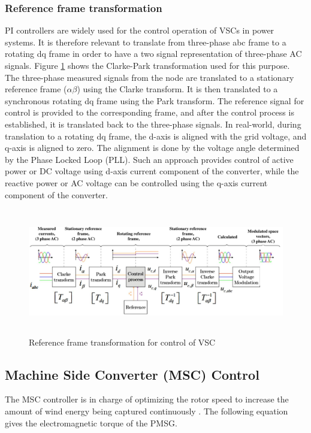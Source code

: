 \subsubsection{Reference frame transformation}\label{ref_frame_trafo}
\gls{PI} controllers are widely used for the control operation of \gls{VSC}s in power systems. It is therefore relevant to translate from three-phase abc frame to a rotating \gls{dq} frame in order to have a two signal representation of three-phase \gls{AC} signals. Figure \ref{fig:DQTransformation} shows the Clarke-Park transformation used for this purpose. The three-phase measured signals from the node are translated to a stationary reference frame ($\alpha \beta$) using the Clarke transform. It is then translated to a synchronous rotating \gls{dq} frame using the Park transform. The reference signal for control is provided to the corresponding frame, and after the control process is established, it is translated back to the three-phase signals. In real-world, during translation to a rotating \gls{dq} frame, the d-axis is aligned with the grid voltage, and q-axis is aligned to zero. The alignment is done by the voltage angle determined by the Phase Locked Loop (\gls{PLL}). Such an approach provides control of active power or \gls{DC} voltage using d-axis current component of the converter, while the reactive power or \gls{AC} voltage can be controlled using the q-axis current component of the converter.   

\begin{figure}[H]
\centering
    \includegraphics[height = 5.5cm,width = 15.5cm]{Diagrams/Chapter_2/DQTransformation.pdf}
    \caption{Reference frame transformation for control of VSC \cite{ndreko2017offshore}}
    \label{fig:DQTransformation}
\end{figure}

\subsection{Machine Side Converter (MSC) Control}
The \gls{MSC} controller is in charge of optimizing the rotor speed to increase the amount of wind energy being captured continuously \cite{strachan_stability_2010}. %
The following equation gives the electromagnetic torque of the \gls{PMSG}.

